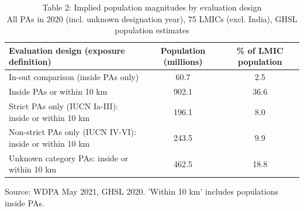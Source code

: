 \begin{table}[t]
\caption*{
{\fontsize{10}{13}\selectfont  Table 2: Implied population magnitudes by evaluation design\fontsize{8}{10}\selectfont } \\ 
{\fontsize{14}{17}\selectfont  All PAs in 2020 (incl. unknown designation year), 75 LMICs (excl. India), GHSL population estimates\fontsize{8}{10}\selectfont }
} 
\fontsize{8.0pt}{10.0pt}\selectfont
\begin{tabular*}{\linewidth}{@{\extracolsep{\fill}}lcc}
\toprule
Evaluation design (exposure definition) & Population (millions) & \% of LMIC population \\ 
\midrule\addlinespace[2.5pt]
In-out comparison (inside PAs only) & 60.7 & 2.5 \\ 
Inside PAs or within 10 km & 902.1 & 36.6 \\ 
Strict PAs only (IUCN Ia-III): inside or within 10 km & 196.1 & 8.0 \\ 
Non-strict PAs only (IUCN IV-VI): inside or within 10 km & 243.5 & 9.9 \\ 
Unknown category PAs: inside or within 10 km & 462.5 & 18.8 \\ 
\bottomrule
\end{tabular*}
\begin{minipage}{\linewidth}
Source: WDPA May 2021, GHSL 2020. 'Within 10 km' includes populations inside PAs.\\
\end{minipage}
\end{table}


